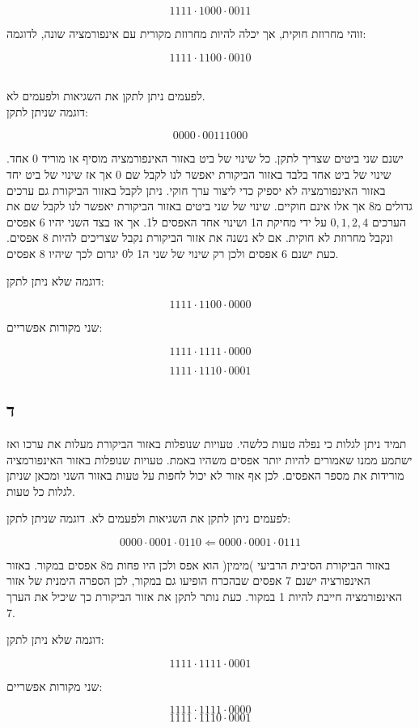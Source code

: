 \documentclass{article}
\begin{document}
$$1111 \cdot 1000 \cdot 0011$$

זוהי מחרוזת חוקית, אך יכלה להיות מחרוזת מקורית עם אינפורמציה שונה, לדוגמה:

$$1111 \cdot 1100 \cdot 0010$$

\\
לפעמים ניתן לתקן את השגיאות ולפעמים לא.
\\
דוגמה שניתן לתקן:

$$0000 \cdot 0011 1000$$

ישנם שני ביטים שצריך לתקן.
כל שינוי של ביט באזור האינפורמציה מוסיף או מוריד 0 אחד.
שינוי של ביט אחד בלבד באזור הביקורת יאפשר לנו לקבל שם 0 אך אז שינוי של ביט יחד באזור האינפורמציה לא יספיק כדי ליצור ערך חוקי. ניתן לקבל באזור הביקורת גם ערכים גדולים מ8 אך אלו אינם חוקיים.
שינוי של שני ביטים באזור הביקורת יאפשר לנו לקבל שם את הערכים $0, 1, 2, 4$ על ידי מחיקת ה1 ושינוי אחד האפסים ל1. אך אז בצד השני יהיו 6 אפסים ונקבל מחרוזת לא חוקית.
אם לא נשנה את אזור הביקורת נקבל שצריכים להיות 8 אפסים. כעת ישנם 6 אפסים ולכן רק שינוי של שני ה1 ל0 יגרום לכך שיהיו 8 אפסים.

דוגמה שלא ניתן לתקן:

$$1111 \cdot 1100 \cdot 0000$$

שני מקורות אפשריים:

$$1111 \cdot 1111 \cdot 0000$$

$$1111 \cdot 1110 \cdot 0001$$

\subsection*{ד}

תמיד ניתן לגלות כי נפלה טעות כלשהי.
טעויות שנופלות באזור הביקורת מעלות את ערכו ואז ישתמע ממנו שאמורים להיות יותר אפסים משהיו באמת.
טעויות שנופלות באזור האינפורמציה מורידות את מספר האפסים. לכן אף אזור לא יכול לחפות על טעות באזור השני ומכאן שניתן לגלות כל טעות.

לפעמים ניתן לתקן את השגיאות ולפעמים לא.
דוגמה שניתן לתקן:

$$0000 \cdot 0001 \cdot 0110 \Leftarrow 0000 \cdot 0001 \cdot 0111$$

באזור הביקורת הסיבית הרביעי )מימין( הוא אפס ולכן היו פחות מ8 אפסים במקור.
באזור האינפורציה ישנם 7 אפסים שבהכרח הופיעו גם במקור, לכן הספרה הימנית של אזור האינפורמציה חייבת להיות 1 במקור. כעת נותר לתקן את אזור הביקורת כך שיכיל את הערך 7.

דוגמה שלא ניתן לתקן:

$$1111 \cdot 1111 \cdot 0001$$

שני מקורות אפשריים:

$$1111 \cdot 1111 \cdot 0000$$
$$1111 \cdot 1110 \cdot 0001$$
\end{document}
